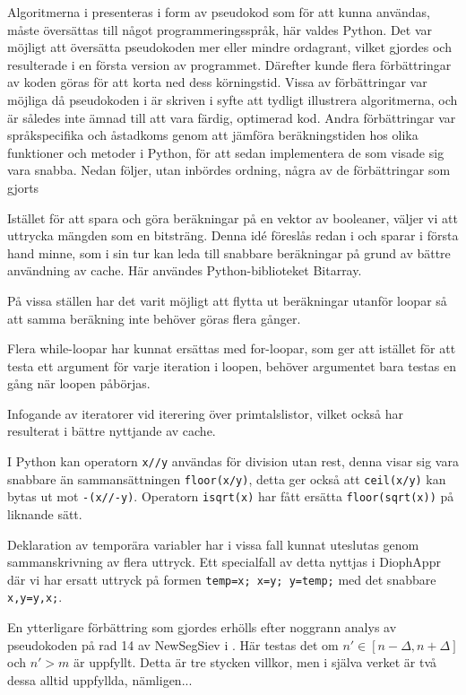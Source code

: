 
Algoritmerna i \cite{HaraldSieve} presenteras i form av pseudokod som för att kunna användas, måste översättas till något programmeringsspråk, här valdes Python.
Det var möjligt att översätta pseudokoden mer eller mindre ordagrant, vilket gjordes och resulterade i en första version av programmet.
Därefter kunde flera förbättringar av koden göras för att korta ned dess körningstid. 
Vissa av förbättringar var möjliga då pseudokoden i \cite{HaraldSieve} är skriven i syfte att tydligt illustrera algoritmerna,
och är således inte ämnad till att vara färdig, optimerad kod.
Andra förbättringar var språkspecifika och åstadkoms genom att jämföra beräkningstiden hos olika funktioner och metoder i Python, för att sedan implementera de som visade sig vara snabba. Nedan följer, utan inbördes ordning, några av de förbättringar som gjorts
\begin{myitemize}
    \item Istället för att spara och göra beräkningar på en vektor av booleaner, väljer vi att uttrycka mängden som en bitsträng. 
    Denna idé föreslås redan i \cite{HaraldSieve} och sparar i första hand minne,
    som i sin tur kan leda till snabbare beräkningar på grund av bättre användning av cache.
    Här användes Python-biblioteket Bitarray.
    \item På vissa ställen har det varit möjligt att flytta ut beräkningar utanför loopar så att samma beräkning inte behöver göras flera gånger.
    \item Flera while-loopar har kunnat ersättas med for-loopar,
    som ger att istället för att testa ett argument för varje iteration i loopen,
    behöver argumentet bara testas en gång när loopen påbörjas.
    \item Infogande av iteratorer vid iterering över primtalslistor, vilket också har resulterat i bättre nyttjande av cache.
    \item I Python kan operatorn \texttt{x//y} användas för division utan rest, denna visar sig vara snabbare än sammansättningen \texttt{floor(x/y)},
    detta ger också att \texttt{ceil(x/y)} kan bytas ut mot \texttt{-(x//-y)}. Operatorn \texttt{isqrt(x)} har fått ersätta \texttt{floor(sqrt(x))} på liknande sätt.
    \item Deklaration av temporära variabler har i vissa fall kunnat uteslutas genom sammanskrivning av flera uttryck. 
    Ett specialfall av detta nyttjas i DiophAppr där vi har ersatt uttryck på formen \texttt{temp=x; x=y; y=temp;} med det snabbare \texttt{x,y=y,x;}.
\end{myitemize}
En ytterligare förbättring som gjordes erhölls efter noggrann analys av pseudokoden på rad 14 av NewSegSiev i \cite[s.338]{HaraldSieve}.
Här testas det om $n'\in[n-\Delta,n+\Delta]$ och $n'>m$ är uppfyllt.
Detta är tre stycken villkor, men i själva verket är två dessa alltid uppfyllda, nämligen...



